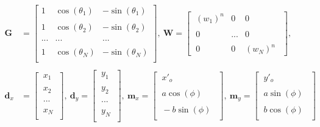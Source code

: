 \documentclass[12pt,runningheads]{article}
\begin{document}
\begin{align*}
\textbf{G} &= 
\begin{bmatrix}
1 & \cos(\theta_{1}) & -\sin(\theta_{1})\\ \\
1 & \cos(\theta_{2}) & -\sin(\theta_{2})\\ \\
... & ... & ... \\ \\
1 & \cos(\theta_{N}) & -\sin(\theta_{N})\\
\end{bmatrix},\ 
\textbf{W} =  
\begin{bmatrix}
\ (w_{1})^{n} & 0 & 0\ \ \\ \\
\ 0 & ... & 0\ \ \\ \\
\ 0 & 0 & (w_{N})^{n}\ \ 
\end{bmatrix},\\ \\
\textbf{d}_{x} &= 
\begin{bmatrix}
\ x_{1} \ \\ \\
\ x_{2} \ \\ \\
\ ... \ \\ \\
\ x_{N} \ \\
\end{bmatrix},\ 
\textbf{d}_{y}= 
\begin{bmatrix}
\ y_{1} \ \\ \\
\ y_{2} \ \\ \\
\ ... \ \\ \\
\ y_{N} \ \\
\end{bmatrix},\  
\textbf{m}_{x}= 
\begin{bmatrix}
\ x'_{o} \ \ \\ \\
\ a\cos(\phi) \ \ \\ \\
\ -b\sin(\phi) \ \ \\
\end{bmatrix},\ 
\textbf{m}_{y}= 
\begin{bmatrix}
\ y'_{o} \ \ \\ \\
\ a\sin(\phi) \ \ \\ \\
\ b\cos(\phi) \ \ \\
\end{bmatrix}
\end{align*}
\end{document}
